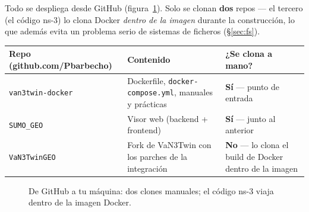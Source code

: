 \documentclass[11pt,a4paper]{article}
\begin{document}
Todo se despliega desde GitHub (figura~\ref{fig:repos}). Solo se clonan
\textbf{dos} repos --- el tercero (el código ns-3) lo clona Docker
\emph{dentro de la imagen} durante la construcción, lo que además evita un
problema serio de sistemas de ficheros (§\ref{sec:fs}).

\begin{center}
\small
\begin{tabular}{@{}lp{}p{}@{}}
\toprule
\textbf{Repo (github.com/Pbarbecho)} & \textbf{Contenido} & \textbf{¿Se clona a mano?} \\
\midrule
\texttt{van3twin-docker} & Dockerfile, \texttt{docker-compose.yml}, manuales y prácticas & \textbf{Sí} — punto de entrada \\
\texttt{SUMO\_GEO} & Visor web (backend + frontend) & \textbf{Sí} — junto al anterior \\
\texttt{VaN3TwinGEO} & Fork de VaN3Twin con los parches de la integración & \textbf{No} — lo clona el build de Docker dentro de la imagen \\
\bottomrule
\end{tabular}
\end{center}

\begin{figure}[h!]
\centering
{}
\caption{De GitHub a tu máquina: dos clones manuales; el código ns-3 viaja
dentro de la imagen Docker.}
\label{fig:repos}
\end{figure}
\end{document}
